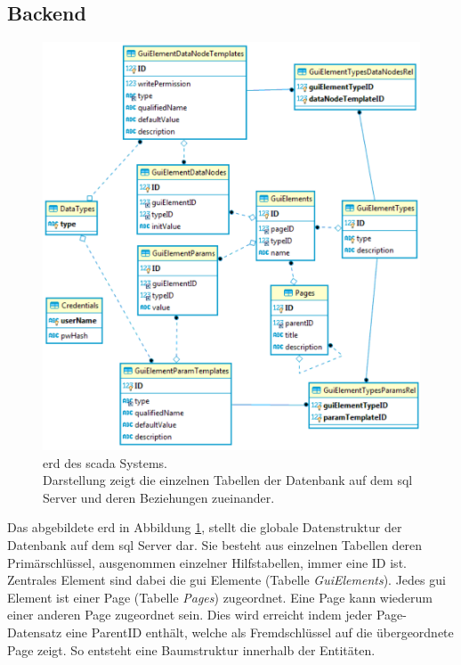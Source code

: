 \subsection{Backend}\label{subsec:dataBackend}
\begin{figure}[ht]
  \centering
  \includegraphics[width=\textwidth]{content/hauptteil/systemEntwurf/res/erd.pdf}
  \caption[\acs{erd} des \acs{scada} Systems]{\acs{erd} des \ac{scada} Systems.\\
    Darstellung zeigt die einzelnen Tabellen der Datenbank auf dem \ac{sql} Server und deren Beziehungen zueinander.}
  \label{img:erd}
\end{figure}
Das abgebildete \ac{erd} in Abbildung \ref{img:erd}, stellt die globale Datenstruktur der Datenbank auf dem \ac{sql} Server dar.
Sie besteht aus einzelnen Tabellen deren Primärschlüssel, ausgenommen einzelner Hilfstabellen, immer eine ID ist.
Zentrales Element sind dabei die \ac{gui} Elemente (Tabelle \emph{GuiElements}). Jedes \ac{gui} Element ist einer Page (Tabelle \emph{Pages}) zugeordnet. 
Eine Page kann wiederum einer anderen Page zugeordnet sein. 
Dies wird erreicht indem jeder Page-Datensatz eine ParentID enthält, welche als Fremdschlüssel auf die übergeordnete Page zeigt. So entsteht eine Baumstruktur innerhalb der Entitäten.
